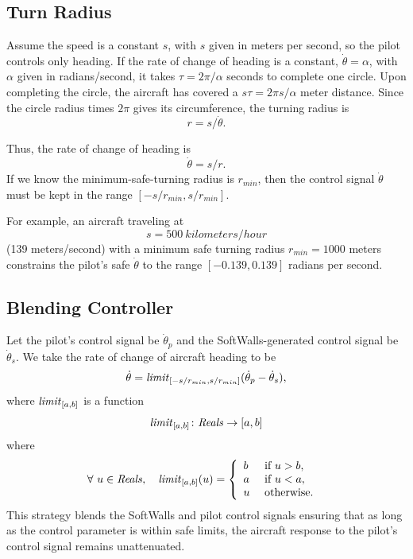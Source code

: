 \documentclass[11pt]{article}
\begin{document}

\subsection{Turn Radius}

Assume the speed is a constant $s$, with $s$ given in meters per
second, so the pilot controls only heading.  If the rate of change of
heading is a constant, $\dot{\theta} = \alpha$, with $\alpha$ given in
radians/second, it takes $\tau = 2 \pi /\alpha$ seconds to complete
one circle.  Upon completing the circle, the aircraft has covered a
$s\tau = 2 \pi s/\alpha$ meter distance.  Since the circle radius
times $2 \pi$ gives its circumference, the turning radius is
\[
r = s/\dot{\theta} .
\]

Thus, the rate of change of heading is
\[
\dot{\theta} = s/r.
\]
If we know the minimum-safe-turning radius is $r_{min}$, then the control
signal $\dot{\theta}$ must be kept in the range $[-s/r_{min},
s/r_{min}]$.

For example, an aircraft traveling at
\[
s = 500~ kilometers/hour
\]
(139 meters/second) with a minimum safe turning radius $r_{min} =
1000$ meters constrains the pilot's safe $\dot{\theta}$ to the range
$[-0.139, 0.139]$ radians per second.


\subsection{Blending Controller}

Let the pilot's control signal be $\dot{\theta}_p$ and the
SoftWalls-generated control signal be $\dot{\theta}_s$.  We take the
rate of change of aircraft heading to be
\[
\dot{\theta} = \mbox{\textit{limit}}_{[-s/r_{min}, s/r_{min}]}
(\dot{\theta}_p - \dot{\theta}_s ),
\]
where $\mbox{\textit{limit}}_{[a,b]}$ is a function
\[
\mbox{\textit{limit}}_{[a,b]} \colon \mbox{\textit{Reals}} \to [a, b]
\]
where
\[
\forall ~ u \in \mbox{\textit{Reals}}, \quad
\mbox{\textit{limit}}_{[a,b]}(u) = \left \{
\begin{array}{ll}
b&\mbox{ if } u > b,\\
a&\mbox{ if } u < a,\\
u&\mbox{ otherwise. }
\end{array}
\right .
\]
This strategy blends the SoftWalls and pilot control signals ensuring
that as long as the control parameter is within safe limits, the
aircraft response to the pilot's control signal remains unattenuated.
\end{document}
